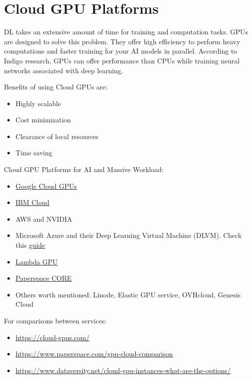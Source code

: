 \section{Cloud GPU Platforms}
\ac{DL} takes an extensive amount of time for training and computation tasks. \ac{GPU}s are designed to solve this problem. They offer high efficiency to perform heavy computations and faster training for your \ac{AI} models in parallel. According to Indigo research, \ac{GPU}s can offer  performance than \ac{CPU}s while training neural networks associated with deep learning. \cite{pathak2022}

Benefits of using Cloud \ac{GPU}s are:
\begin{itemize}
	\item Highly scalable
	\item Cost minimization
	\item Clearance of local resources
	\item Time saving
\end{itemize}

Cloud GPU Platforms for \ac{AI} and Massive Workload:
\begin{itemize}
	\item \href{https://cloud.google.com/compute/docs/gpus}{Google Cloud \ac{GPU}s}
	\item \href{https://www.ibm.com/cloud/gpu}{IBM Cloud}
	\item AWS and NVIDIA
	\item Microsoft Azure and their Deep Learning Virtual Machine (DLVM). Check this \href{https://medium.com/@manikantayadunanda/setting-up-deeplearning-machine-and-fast-ai-on-azure-a22eb6bd6429}{guide}
	\item \href{https://lambdalabs.com/service/gpu-cloud}{Lambda GPU}
	\item \href{https://www.paperspace.com/core}{Paperspace CORE}
	\item Others worth mentioned: Linode, Elastic \ac{GPU} service, OVHcloud, Genesis Cloud
\end{itemize}

For comparisons between services:
\begin{itemize}
	\item \url{https://cloud-gpus.com/}
	\item \url{https://www.paperspace.com/gpu-cloud-comparison}
	\item \url{https://www.dataversity.net/cloud-gpu-instances-what-are-the-options/}
\end{itemize}

